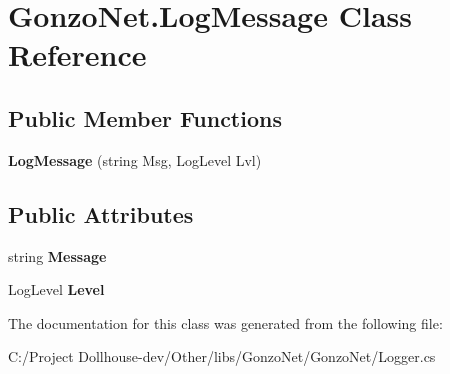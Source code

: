 \hypertarget{class_gonzo_net_1_1_log_message}{\section{Gonzo\+Net.\+Log\+Message Class Reference}
\label{class_gonzo_net_1_1_log_message}
}
\subsection*{Public Member Functions}
\begin{DoxyCompactItemize}
\item 
\hypertarget{class_gonzo_net_1_1_log_message_a98e1ad23e595ca5ab6ff885f34362743}{{\bfseries Log\+Message} (string Msg, Log\+Level Lvl)}\label{class_gonzo_net_1_1_log_message_a98e1ad23e595ca5ab6ff885f34362743}

\end{DoxyCompactItemize}
\subsection*{Public Attributes}
\begin{DoxyCompactItemize}
\item 
\hypertarget{class_gonzo_net_1_1_log_message_a479ba2e1775e2b9d3942f360ef38b60d}{string {\bfseries Message}}\label{class_gonzo_net_1_1_log_message_a479ba2e1775e2b9d3942f360ef38b60d}

\item 
\hypertarget{class_gonzo_net_1_1_log_message_a80fa34b0a865ff04b9071a62d24ff563}{Log\+Level {\bfseries Level}}\label{class_gonzo_net_1_1_log_message_a80fa34b0a865ff04b9071a62d24ff563}

\end{DoxyCompactItemize}


The documentation for this class was generated from the following file\+:\begin{DoxyCompactItemize}
\item 
C\+:/\+Project Dollhouse-\/dev/\+Other/libs/\+Gonzo\+Net/\+Gonzo\+Net/Logger.\+cs\end{DoxyCompactItemize}
